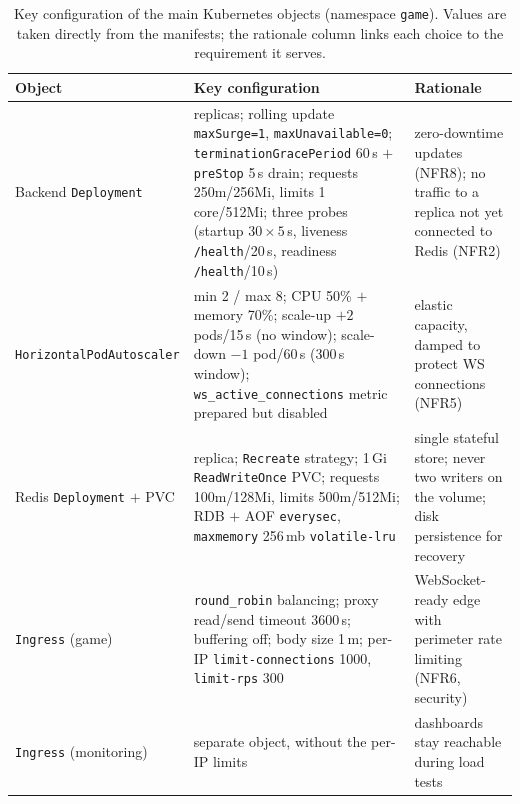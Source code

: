 \documentclass{scrartcl}
\begin{document}
\begin{table}[H]
  \centering
  \footnotesize
  \setlength{\tabcolsep}{6pt}
  \renewcommand{\arraystretch}{1.3}
  \caption{Key configuration of the main Kubernetes objects (namespace
    \texttt{game}). Values are taken directly from the manifests; the
    rationale column links each choice to the requirement it serves.}
  \label{tab:k8s}
  \begin{tabular}{@{}
    >{\raggedright\arraybackslash}p{2.8cm}
    >{\raggedright\arraybackslash}p{7.4cm}
    >{\raggedright\arraybackslash}p{3.0cm}@{}}
    \toprule
    \textbf{Object} & \textbf{Key configuration} & \textbf{Rationale} \\
    \midrule
    Backend \texttt{Deploy\-ment}
      & 2 replicas; rolling update \texttt{maxSurge=1}, \texttt{maxUnavailable=0};
        \texttt{terminationGracePeriod} 60\,s $+$ \texttt{preStop} 5\,s drain;
        requests 250m/256Mi, limits 1\,core/512Mi; three probes (startup
        $30\times5$\,s, liveness \texttt{/health}/20\,s, readiness
        \texttt{/health}/10\,s)
      & zero-downtime updates (NFR8); no traffic to a replica not yet
        connected to Redis (NFR2) \\
    \texttt{Horizontal\-Pod\-Autoscaler}
      & min 2 / max 8; CPU 50\% $+$ memory 70\%; scale-up $+2$ pods/15\,s
        (no window); scale-down $-1$ pod/60\,s (300\,s window);
        \texttt{ws\_active\_connections} metric prepared but disabled
      & elastic capacity, damped to protect WS connections (NFR5) \\
    Redis \texttt{Deploy\-ment} $+$ PVC
      & 1 replica; \texttt{Recreate} strategy; 1\,Gi \texttt{ReadWrite\-Once}
        PVC; requests 100m/128Mi, limits 500m/512Mi; RDB $+$ AOF
        \texttt{everysec}, \texttt{maxmemory} 256\,mb \texttt{volatile-lru}
      & single stateful store; never two writers on the volume; disk
        persistence for recovery \\
    \texttt{Ingress} (game)
      & \texttt{round\_robin} balancing; proxy read/send timeout 3600\,s;
        buffering off; body size 1\,m; per-IP \texttt{limit-connections} 1000,
        \texttt{limit-rps} 300
      & WebSocket-ready edge with perimeter rate limiting (NFR6, security) \\
    \texttt{Ingress} (monitoring)
      & separate object, without the per-IP limits
      & dashboards stay reachable during load tests \\
    \bottomrule
  \end{tabular}
\end{table}
\end{document}
